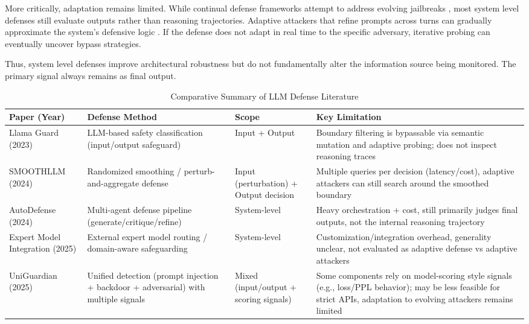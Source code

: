 \documentclass[conference]{IEEEtran}
\begin{document}
More critically, adaptation remains limited. While continual defense frameworks attempt to address evolving jailbreaks \cite{b22}, most system level defenses still evaluate outputs rather than reasoning trajectories. Adaptive attackers that refine prompts across turns can gradually approximate the system's defensive logic \cite{b15,b16}. If the defense does not adapt in real time to the specific adversary, iterative probing can eventually uncover bypass strategies.

Thus, system level defenses improve architectural robustness but do not fundamentally alter the information source being monitored. The primary signal always remains as final output.

\begin{table}[!t]
\caption{Comparative Summary of LLM Defense Literature}
\label{tab:defensive-literature}
\centering
{\scriptsize
\setlength{\tabcolsep}{3pt}
\renewcommand{\arraystretch}{1.1}
\begin{tabular}{|L{3.8cm}|L{3.3cm}|L{2.2cm}|L{6.3cm}|}
\hline
\textbf{Paper (Year)} & \textbf{Defense Method} & \textbf{Scope} & \textbf{Key Limitation} \\
\hline
\cite{b17} Llama Guard (2023) & LLM-based safety classification (input/output safeguard) & Input + Output & Boundary filtering is bypassable via semantic mutation and adaptive probing; does not inspect reasoning traces \\
\hline
\cite{b18} SMOOTHLLM (2024) & Randomized smoothing / perturb-and-aggregate defense & Input (perturbation) + Output decision & Multiple queries per decision (latency/cost), adaptive attackers can still search around the smoothed boundary \\
\hline
\cite{b19} AutoDefense (2024) & Multi-agent defense pipeline (generate/critique/refine) & System-level & Heavy orchestration + cost, still primarily judges final outputs, not the internal reasoning trajectory \\
\hline
\cite{b20} Expert Model Integration (2025) & External expert model routing / domain-aware safeguarding & System-level & Customization/integration overhead, generality unclear, not evaluated as adaptive defense vs adaptive attackers \\
\hline
\cite{b21} UniGuardian (2025) & Unified detection (prompt injection + backdoor + adversarial) with multiple signals & Mixed (input/output + scoring signals) & Some components rely on model-scoring style signals (e.g., loss/PPL behavior); may be less feasible for strict APIs, adaptation to evolving attackers remains limited \\

\end{tabular}}
\end{table}
\end{document}
